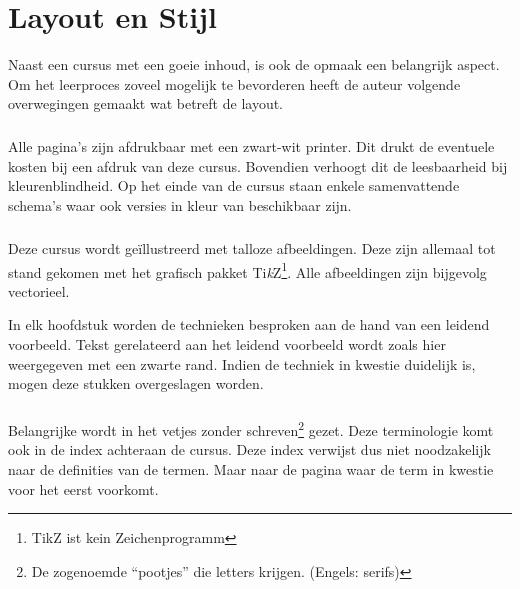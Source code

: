 \chapter*{Layout en Stijl}
Naast een cursus met een goeie inhoud, is ook de opmaak een belangrijk aspect. Om het leerproces zoveel mogelijk te bevorderen heeft de auteur volgende overwegingen gemaakt wat betreft de layout.
\paragraph{}
Alle pagina's zijn afdrukbaar met een zwart-wit printer. Dit drukt de eventuele kosten bij een afdruk van deze cursus. Bovendien verhoogt dit de leesbaarheid bij kleurenblindheid. Op het einde van de cursus staan enkele samenvattende schema's waar ook versies in kleur van beschikbaar zijn.
\paragraph{}
Deze cursus wordt ge\"illustreerd met talloze afbeeldingen. Deze zijn allemaal tot stand gekomen met het grafisch pakket Ti\textit{k}Z\footnote{TikZ ist kein Zeichenprogramm}. Alle afbeeldingen zijn bijgevolg vectorieel.
\begin{leftbar}
In elk hoofdstuk worden de technieken besproken aan de hand van een leidend voorbeeld. Tekst gerelateerd aan het leidend voorbeeld wordt zoals hier weergegeven met een zwarte rand. Indien de techniek in kwestie duidelijk is, mogen deze stukken overgeslagen worden.
\end{leftbar}
\paragraph{}
Belangrijke  wordt in het vetjes zonder schreven\footnote{De zogenoemde ``pootjes'' die letters krijgen. (Engels: serifs)} gezet. Deze terminologie komt ook in de index achteraan de cursus. Deze index verwijst dus niet noodzakelijk naar de definities van de termen. Maar naar de pagina waar de term in kwestie voor het eerst voorkomt.
\begin{figure}[H]
\centering
{}
\end{figure}
